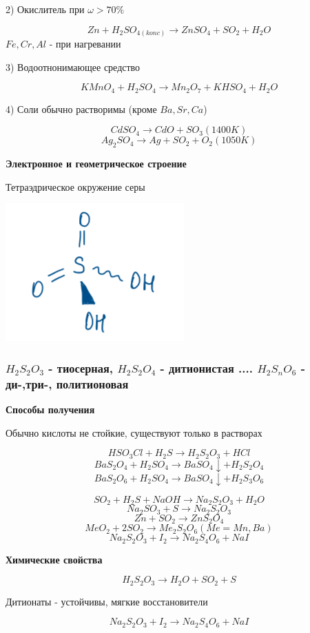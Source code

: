 \documentclass[14pt,a4paper]{scrartcl}
\begin{document}
2) Окислитель при $\omega > 70\%$

$$Zn + H_2SO_{4(konc)} \rightarrow ZnSO_4 + SO_2 + H_2O$$
$Fe,Cr, Al$ - при нагревании

3) Водоотнонимающее средство

$$KMnO_4 + H_2SO_4 \rightarrow Mn_2O_7 + KHSO_4 + H_2O$$

4) Соли обычно растворимы (кроме $Ba, Sr, Ca$)

$$CdSO_4 \rightarrow CdO + SO_3 (1400K)$$
$$Ag_2SO_4 \rightarrow Ag + SO_2 + O_2 (1050K)$$

\textbf{Электронное и геометрическое строение}

Тетраэдрическое окружение серы

\includegraphics{7v7.png}


\subsubsection{$H_2S_2O_3$ - тиосерная, $H_2S_2O_4$ - дитионистая .... $H_2S_nO_6$ - ди-,три-, политионовая}


\textbf{Способы получения}

Обычно кислоты не стойкие, существуют только в растворах

$$HSO_3Cl + H_2S \rightarrow H_2S_2O_3 + HCl$$
$$BaS_2O_4 + H_2SO_4 \rightarrow BaSO_4\downarrow + H_2S_2O_4$$
$$BaS_2O_6 + H_2SO_4 \rightarrow BaSO_4\downarrow + H_2S_3O_6$$

$$SO_2 + H_2S + NaOH \rightarrow Na_2S_2O_3 + H_2O$$
$$Na_2SO_3 + S \rightarrow Na_2S_2O_3$$
$$Zn + SO_2 \rightarrow ZnS_2O_4$$
$$MeO_2 + 2SO_2 \rightarrow Me_2S_2O_6 (Me= Mn, Ba)$$
$$Na_2S_2O_3 +I_2 \rightarrow Na_2S_4O_6 + NaI$$

\textbf{Химические свойства}

$$H_2S_2O_3 \rightarrow H_2O + SO_2 + S$$ 

Дитионаты - устойчивы, мягкие восстановители

$$Na_2S_2O_3 + I_2 \rightarrow Na_2S_4O_6 + NaI$$
\end{document}

